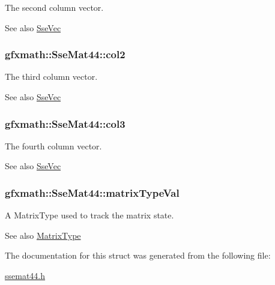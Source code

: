 The second column vector. 

\begin{DoxySeeAlso}{See also}
\hyperlink{namespacegfxmath_a0de2243e2b8d0fd46d3af5e036423004}{Sse\+Vec} 
\end{DoxySeeAlso}
\hypertarget{structgfxmath_1_1_sse_mat44_a636928a37222e474300ea4aa5ff5221c}{}
\subsubsection[{col2}]{ gfxmath\+::\+Sse\+Mat44\+::col2}\label{structgfxmath_1_1_sse_mat44_a636928a37222e474300ea4aa5ff5221c}


The third column vector. 

\begin{DoxySeeAlso}{See also}
\hyperlink{namespacegfxmath_a0de2243e2b8d0fd46d3af5e036423004}{Sse\+Vec} 
\end{DoxySeeAlso}
\hypertarget{structgfxmath_1_1_sse_mat44_a7ee53ec82e31166ee87c6dfe6bc5810c}{}
\subsubsection[{col3}]{ gfxmath\+::\+Sse\+Mat44\+::col3}\label{structgfxmath_1_1_sse_mat44_a7ee53ec82e31166ee87c6dfe6bc5810c}


The fourth column vector. 

\begin{DoxySeeAlso}{See also}
\hyperlink{namespacegfxmath_a0de2243e2b8d0fd46d3af5e036423004}{Sse\+Vec} 
\end{DoxySeeAlso}
\hypertarget{structgfxmath_1_1_sse_mat44_abdcc4efbf8375bae103da12c0823a85c}{}
\subsubsection[{matrix\+Type\+Val}]{ gfxmath\+::\+Sse\+Mat44\+::matrix\+Type\+Val}\label{structgfxmath_1_1_sse_mat44_abdcc4efbf8375bae103da12c0823a85c}


A Matrix\+Type used to track the matrix state. 

\begin{DoxySeeAlso}{See also}
\hyperlink{namespacegfxmath_a6c8951c82aec5015dd6806affb4c8d03}{Matrix\+Type} 
\end{DoxySeeAlso}


The documentation for this struct was generated from the following file\+:\begin{DoxyCompactItemize}
\item 
\hyperlink{ssemat44_8h}{ssemat44.\+h}\end{DoxyCompactItemize}
